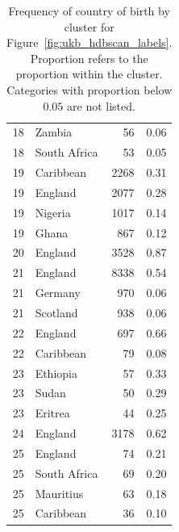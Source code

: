 \begin{table}[ht]
{\begin{tabular}[t]{rlrr}
   18 & Zambia &  56 & 0.06 \\ 
   18 & South Africa &  53 & 0.05 \\ 
   19 & Caribbean & 2268 & 0.31 \\ 
   19 & England & 2077 & 0.28 \\ 
   19 & Nigeria & 1017 & 0.14 \\ 
   19 & Ghana & 867 & 0.12 \\ 
   20 & England & 3528 & 0.87 \\ 
   21 & England & 8338 & 0.54 \\ 
   21 & Germany & 970 & 0.06 \\ 
   21 & Scotland & 938 & 0.06 \\ 
   22 & England & 697 & 0.66 \\ 
   22 & Caribbean &  79 & 0.08 \\ 
   23 & Ethiopia &  57 & 0.33 \\ 
   23 & Sudan &  50 & 0.29 \\ 
   23 & Eritrea &  44 & 0.25 \\ 
   24 & England & 3178 & 0.62 \\ 
   25 & England &  74 & 0.21 \\ 
   25 & South Africa &  69 & 0.20 \\ 
   25 & Mauritius &  63 & 0.18 \\ 
   25 & Caribbean &  36 & 0.10 \\ 
   \hline
\end{tabular}
}
\caption[Frequency of country of birth by cluster]{Frequency of country of birth by cluster for Figure~\ref{fig:ukb_hdbscan_labels}. Proportion refers to the proportion within the cluster. Categories with proportion below $0.05$ are not listed.}
\label{table:supp_ukb_cluster_cob} 
\end{table} 

\clearpage

